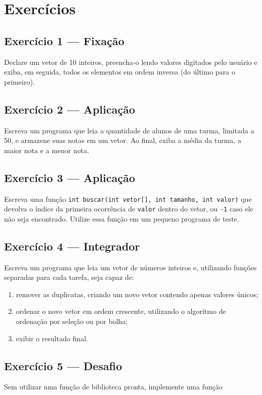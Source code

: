 \documentclass[12pt,a4paper,oneside]{extreport}
\begin{document}
\section*{Exercícios}

\subsection*{Exercício 1 --- Fixação}
Declare um vetor de 10 inteiros, preencha-o lendo valores digitados pelo usuário e exiba, em seguida, todos os elementos em ordem inversa (do último para o primeiro).

\subsection*{Exercício 2 --- Aplicação}
Escreva um programa que leia a quantidade de alunos de uma turma, limitada a 50, e armazene suas notas em um vetor. Ao final, exiba a média da turma, a maior nota e a menor nota.

\subsection*{Exercício 3 --- Aplicação}
Escreva uma função \texttt{int buscar(int vetor[], int tamanho, int valor)} que devolva o índice da primeira ocorrência de \texttt{valor} dentro do vetor, ou \texttt{-1} caso ele não seja encontrado. Utilize essa função em um pequeno programa de teste.

\subsection*{Exercício 4 --- Integrador}
Escreva um programa que leia um vetor de números inteiros e, utilizando funções separadas para cada tarefa, seja capaz de:

\begin{enumerate}
\item remover as duplicatas, criando um novo vetor contendo apenas valores únicos;
\item ordenar o novo vetor em ordem crescente, utilizando o algoritmo de ordenação por seleção ou por bolha;
\item exibir o resultado final.
\end{enumerate}

\subsection*{Exercício 5 --- Desafio}
Sem utilizar uma função de biblioteca pronta, implemente uma função
\end{document}
